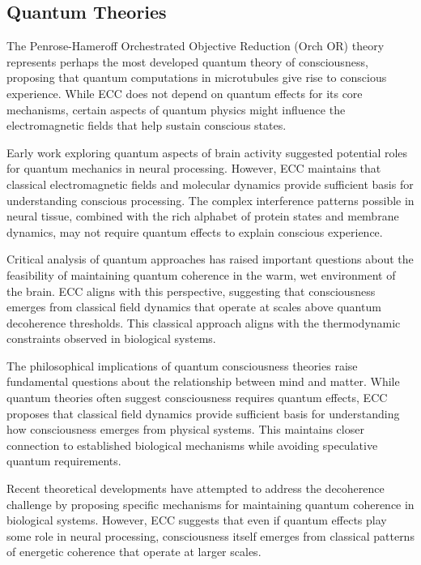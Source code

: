 \begin{refsection}
\section{Quantum Theories}

The Penrose-Hameroff Orchestrated Objective Reduction (Orch OR) theory \cite{Hameroff2014} represents perhaps the most developed quantum theory of consciousness, proposing that quantum computations in microtubules give rise to conscious experience. While ECC does not depend on quantum effects for its core mechanisms, certain aspects of quantum physics might influence the electromagnetic fields that help sustain conscious states.

Early work exploring quantum aspects of brain activity \cite{Beck1992} suggested potential roles for quantum mechanics in neural processing. However, ECC maintains that classical electromagnetic fields and molecular dynamics provide sufficient basis for understanding conscious processing. The complex interference patterns possible in neural tissue, combined with the rich alphabet of protein states and membrane dynamics, may not require quantum effects to explain conscious experience.

Critical analysis of quantum approaches \cite{Tegmark2000} has raised important questions about the feasibility of maintaining quantum coherence in the warm, wet environment of the brain. ECC aligns with this perspective, suggesting that consciousness emerges from classical field dynamics that operate at scales above quantum decoherence thresholds. This classical approach aligns with the thermodynamic constraints observed in biological systems.

The philosophical implications of quantum consciousness theories \cite{Stapp2009} raise fundamental questions about the relationship between mind and matter. While quantum theories often suggest consciousness requires quantum effects, ECC proposes that classical field dynamics provide sufficient basis for understanding how consciousness emerges from physical systems. This maintains closer connection to established biological mechanisms while avoiding speculative quantum requirements.

Recent theoretical developments \cite{Hagan2002} have attempted to address the decoherence challenge by proposing specific mechanisms for maintaining quantum coherence in biological systems. However, ECC suggests that even if quantum effects play some role in neural processing, consciousness itself emerges from classical patterns of energetic coherence that operate at larger scales.


\end{refsection}
